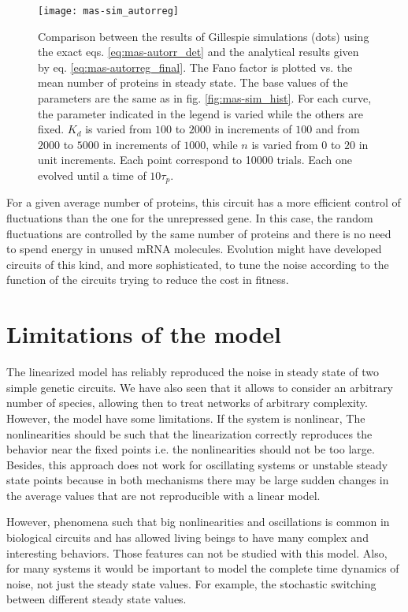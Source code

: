 \begin{figure}[H]
  \centering
  \texttt{[image: mas-sim\_autorreg]}
  \caption[Fano factor of protein number for a negatively autorregulated gene]{\label{fig:mas-sim_autorreg} Comparison between the results of Gillespie simulations (dots) using the exact eqs. \eqref{eq:mas-autorr_det} and the analytical results given by eq. \eqref{eq:mas-autorreg_final}. The Fano factor is plotted vs. the mean number of proteins in steady state. The base values of the parameters are the same as in fig. \ref{fig:mas-sim_hist}. For each curve, the parameter indicated in the legend is varied while the others are fixed. $K_d$ is varied from $100$ to $2000$ in increments of $100$ and from $2000$ to $5000$ in increments of $1000$, while $n$ is varied from $0$ to $20$ in unit increments. Each point correspond to 10000 trials. Each one evolved until a time of $10\tau_p$.}
\end{figure}

For a given average number of proteins, this circuit has a more efficient control of fluctuations than the one for the unrepressed gene. In this case, the random fluctuations are controlled by the same number of proteins and there is no need to spend energy in unused mRNA molecules. Evolution might have developed circuits of this kind, and more sophisticated, to tune the noise according to the function of the circuits trying to reduce the cost in fitness.

\section{Limitations of the model}

The linearized model has reliably reproduced the noise in steady state of two simple genetic circuits. We have also seen that it allows to consider an arbitrary number of species, allowing then to treat networks of arbitrary complexity. However, the model have some limitations. If the system is nonlinear, The nonlinearities should be such that the linearization correctly reproduces the behavior near the fixed points i.e. the nonlinearities should not be too large. Besides, this approach does not work for oscillating systems or unstable steady state points because in both mechanisms there may be large sudden changes in the average values that are not reproducible with a linear model.

However, phenomena such that big nonlinearities and oscillations is common in biological circuits and has allowed living beings to have many complex and interesting behaviors. Those features can not be studied with this model. Also, for many systems it would be important to model the complete time dynamics of noise, not just the steady state values. For example, the stochastic switching between different steady state values. 

